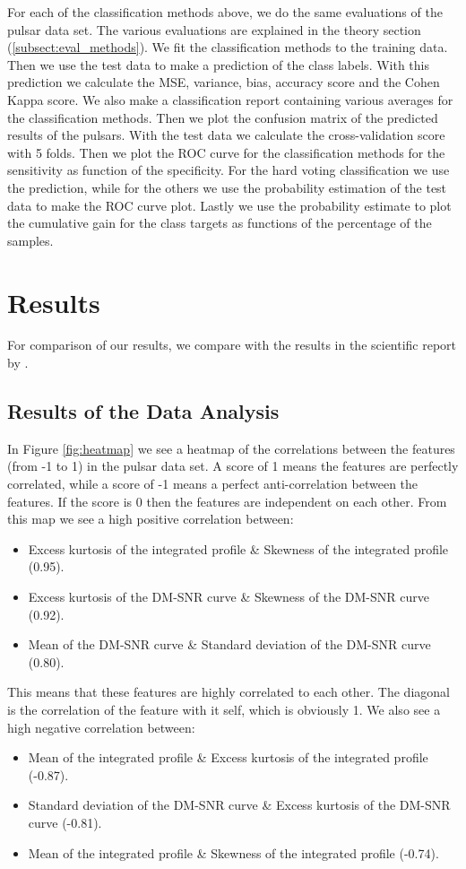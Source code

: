 \documentclass[12pt,a4paper,english]{article}
\begin{document}
For each of the classification methods above, we do the same evaluations of the pulsar data set. The various evaluations are explained in the theory section (\ref{subsect:eval_methods}). We fit the classification methods to the training data. Then we use the test data to make a prediction of the class labels. With this prediction we calculate the MSE, variance, bias, accuracy score and the Cohen Kappa score. We also make a classification report containing various averages for the classification methods. Then we plot the confusion matrix of the predicted results of the pulsars. With the test data we calculate the cross-validation score with 5 folds. Then we plot the ROC curve for the classification methods for the sensitivity as function of the specificity. For the hard voting classification we use the prediction, while for the others we use the probability estimation of the test data to make the ROC curve plot. Lastly we use the probability estimate to plot the cumulative gain for the class targets as functions of the percentage of the samples.

\section{Results}
\label{sect:Results}
For comparison of our results, we compare with the results in the scientific report by \citet{pulsar_art}.

\subsection{Results of the Data Analysis}
\label{subsect:Res_analysis}
In Figure \ref{fig:heatmap} we see a heatmap of the correlations between the features (from -1 to 1) in the pulsar data set. A score of 1 means the features are perfectly correlated, while a score of -1 means a perfect anti-correlation between the features. If the score is 0 then the features are independent on each other. From this map we see a high positive correlation between:
\begin{itemize}
	\item Excess kurtosis of the integrated profile \& Skewness of the integrated profile (0.95).
	\item Excess kurtosis of the DM-SNR curve \& Skewness of the DM-SNR curve (0.92).
	\item Mean of the DM-SNR curve \& Standard deviation of the DM-SNR curve (0.80).
\end{itemize}
This means that these features are highly correlated to each other. The diagonal is the correlation of the feature with it self, which is obviously 1. We also see a high negative correlation between:
\begin{itemize}
	\item Mean of the integrated profile \& Excess kurtosis of the integrated profile (-0.87).
	\item Standard deviation of the DM-SNR curve \& Excess kurtosis of the DM-SNR curve (-0.81).
	\item Mean of the integrated profile \& Skewness of the integrated profile (-0.74).
\end{itemize}
\end{document}
